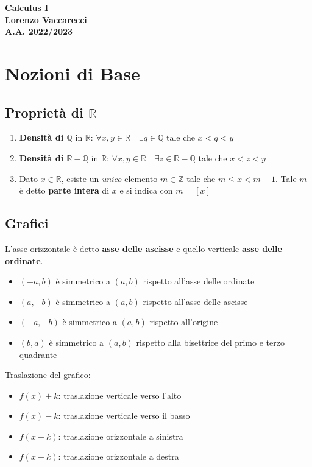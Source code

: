 \documentclass[12pt, a4paper]{report}
\begin{document}
    \begin{titlepage}
        \centering
        \vfill
        {\bfseries\Huge
            Calculus I\\
            \vskip1cm
            \Large
            Lorenzo Vaccarecci\\
            \vskip1cm
            \normalsize
            A.A. 2022/2023
        }
        \vfill
        \vfill
        \vfill
    \end{titlepage}
    \tableofcontents
    \chapter{Nozioni di Base}
    \section{Proprietà di $\mathbb{R}$}
    \begin{enumerate}
        \item \textbf{Densità di $\mathbb{Q} \text{ in } \mathbb{R}$}: $\forall x,y \in \mathbb{R} \quad \exists q \in \mathbb{Q}$ tale che $x<q<y$
        \item \textbf{Densità di $\mathbb{R}-\mathbb{Q} \text{ in } \mathbb{R}$}: $\forall x,y \in \mathbb{R} \quad \exists z \in \mathbb{R}-\mathbb{Q}$ tale che $x<z<y$
        \item Dato $x \in \mathbb{R}$, esiste un \textit{unico} elemento $m \in \mathbb{Z}$ tale che $m \leq x < m+1$. Tale $m$ è detto \textbf{parte intera} di $x$ e si indica con $m=[x]$
    \end{enumerate}
    \section{Grafici}
    L'asse orizzontale è detto \textbf{asse delle ascisse} e quello verticale \textbf{asse delle ordinate}.
    \begin{itemize}
        \item $(-a,b)$ è simmetrico a $(a,b)$ rispetto all'asse delle ordinate
        \item $(a,-b)$ è simmetrico a $(a,b)$ rispetto all'asse delle ascisse
        \item $(-a,-b)$ è simmetrico a $(a,b)$ rispetto all'origine
        \item $(b,a)$ è simmetrico a $(a,b)$ rispetto alla bisettrice del primo e terzo quadrante
    \end{itemize}
    Traslazione del grafico:
    \begin{itemize}
        \item $f(x)+k$: traslazione verticale verso l'alto
        \item $f(x)-k$: traslazione verticale verso il basso
        \item $f(x+k)$: traslazione orizzontale a sinistra
        \item $f(x-k)$: traslazione orizzontale a destra
    \end{itemize}
\end{document}
